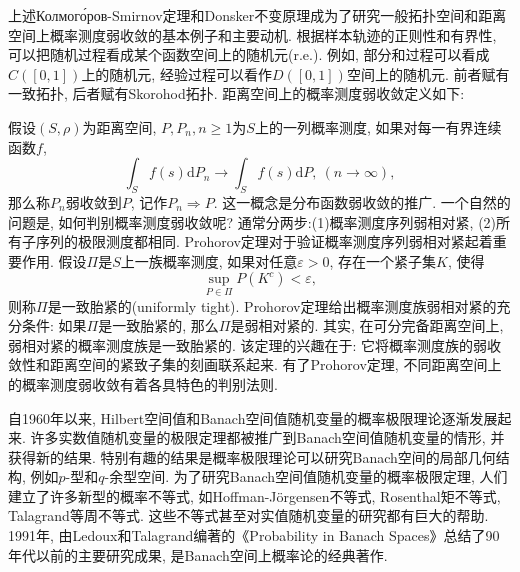 上述Колмого́ров-Smirnov定理和Donsker不变原理成为了研究一般拓扑空间和距离空间上概率测度弱收敛的基本例子和主要动机. 根据样本轨迹的正则性和有界性, 可以把随机过程看成某个函数空间上的随机元(r.e.). 例如, 部分和过程可以看成$C([0,1])$上的随机元, 经验过程可以看作$D([0,1])$空间上的随机元. 前者赋有一致拓扑, 后者赋有Skorohod拓扑. 距离空间上的概率测度弱收敛定义如下:

假设$(S,\rho)$为距离空间, $P,P_n, n\geqslant 1$为$S$上的一列概率测度, 如果对每一有界连续函数$f$,
\begin{equation}\label{eq:A49}
\int_Sf(s)\mathrm{d}P_n\to\int_Sf(s)\mathrm{d}P,~(n\to\infty),
\end{equation}
那么称$P_n$弱收敛到$P$, 记作$P_n\Rightarrow P$. 这一概念是分布函数弱收敛的推广. 一个自然的问题是, 如何判别概率测度弱收敛呢? 通常分两步:(1)概率测度序列弱相对紧, (2)所有子序列的极限测度都相同. Prohorov定理对于验证概率测度序列弱相对紧起着重要作用. 假设$\Pi$是$S$上一族概率测度, 如果对任意$\varepsilon>0$, 存在一个紧子集$K$, 使得\begin{equation}\label{eq:A50}
\sup_{P\in\Pi}P(K^c)<\varepsilon,
\end{equation}
则称$\Pi$是一致胎紧的(uniformly tight). Prohorov定理给出概率测度族弱相对紧的充分条件: 如果$\Pi$是一致胎紧的, 那么$\Pi$是弱相对紧的. 其实, 在可分完备距离空间上, 弱相对紧的概率测度族是一致胎紧的. 该定理的兴趣在于: 它将概率测度族的弱收敛性和距离空间的紧致子集的刻画联系起来. 有了Prohorov定理, 不同距离空间上的概率测度弱收敛有着各具特色的判别法则.

自1960年以来, Hilbert空间值和Banach空间值随机变量的概率极限理论逐渐发展起来. 许多实数值随机变量的极限定理都被推广到Banach空间值随机变量的情形, 并获得新的结果. 特别有趣的结果是概率极限理论可以研究Banach空间的局部几何结构, 例如$p$-型和$q$-余型空间. 为了研究Banach空间值随机变量的概率极限定理, 人们建立了许多新型的概率不等式, 如Hoffman-Jörgensen不等式, Rosenthal矩不等式, Talagrand等周不等式. 这些不等式甚至对实值随机变量的研究都有巨大的帮助. 1991年, 由Ledoux和Talagrand编著的《Probability in Banach Spaces》总结了90年代以前的主要研究成果, 是Banach空间上概率论的经典著作.

